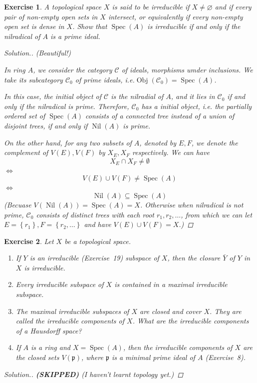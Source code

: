 \documentclass{article}
\theoremstyle{breakstyle}
\newtheorem{exercise}{Exercise}
\newenvironment{solution}
  {\begin{proof}[Solution.]\renewcommand{\qedsymbol}{}}
  {\end{proof}}
\DeclareMathOperator{\nil}{Nil}
\DeclareMathOperator{\obj}{Obj}
\DeclareMathOperator{\spec}{Spec}
\begin{document}
\begin{exercise}
A topological space \(X\) is said to be irreducible if \(X\neq\varnothing\) and if every pair of non-empty open sets in \(X\) intersect, or equivalently if every non-empty open set is dense in \(X\). Show that \(\spec(A)\) is irreducible if and only if the nilradical of \(A\) is a prime ideal.

\begin{solution}
    \emph{(Beautiful!)}

        In ring $A$, we consider the category $\mathscr{C}$ of ideals, morphisms umder inclusions.
        We take its subcategory $\mathscr{C}_{0}$ of prime ideals, i.e.$\obj(\mathscr{C}_0)=\spec(A)$.

        In this case, the initial object of $\mathscr{C}$ is the nilradial of $A$,
        and it lies in $\mathscr{C}_{0}$ if and only if the nilradical is prime.
        Therefore, $\mathscr{C}_{0}$ has a initial object,
        i.e. the partially ordered set of $\spec(A)$ consists of a connected tree instead of a union of disjoint trees,
        if and only if $\nil(A)$ is prime.

        On the other hand, for any two subsets of $A$, denoted by $E,F$,
        we denote the complement of $V(E),V(F)$ by $X_{E},X_{F}$ respectively.
        We can have
        $$
        X_{E}\cap X_{F}\neq \emptyset
        $$
        $\Leftrightarrow$ 
        $$
        V(E)\cup V(F)\neq \spec(A)
        $$
        $\Leftrightarrow$ 
        $$
        \nil(A)\subseteq \spec(A)
        $$
        (Becuase $V(\nil(A))=\spec(A)=X$.
        Otherwise when nilradical is not prime,
        $\mathscr{C}_{0}$ consists of distinct trees with each root $r_1,r_2,\ldots $,
        from which we can let $E=\left\{ r_1 \right\} ,F=\left\{ r_2,\ldots  \right\} $ and have $V(E)\cup V(F)=X$.)
\end{solution}
\end{exercise}

\begin{exercise}
Let \(X\) be a topological space.
\begin{enumerate}[label=(\roman*)]
    \item If \(Y\) is an irreducible (Exercise~19) subspace of \(X\), then the closure \(\bar Y\) of \(Y\) in \(X\) is irreducible.
    \item Every irreducible subspace of \(X\) is contained in a maximal irreducible subspace.
    \item The maximal irreducible subspaces of \(X\) are closed and cover \(X\). They are called the irreducible components of \(X\). What are the irreducible components of a Hausdorff space?
    \item If \(A\) is a ring and \(X=\spec(A)\), then the irreducible components of \(X\) are the closed sets \(V(\mathfrak p)\), where \(\mathfrak p\) is a minimal prime ideal of \(A\) (Exercise~8).
\end{enumerate}

\begin{solution}
    \textbf{(SKIPPED)}
        \emph{(I haven't learnt topology yet.)}
\end{solution}
\end{exercise}
\end{document}
